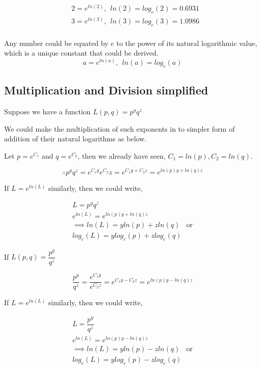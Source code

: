\documentclass[float=false,crop=false]{standalone}
\begin{document}
\[
\begin{aligned}
& 2 = e^{ln(2)}, \ \ ln(2) = log_e(2) = 0.6931 \\
& 3 = e^{ln(3)}, \ \ ln(3) = log_e(3) = 1.0986 \\
\end{aligned}
\]
\begin{tcolorbox}[colback=green!5,colframe=green!40!black,title=Any number in terms of $e$]
Any number could be equated by $e$ to the power of its natural logarithmic value, which is a unique constant that could be derived. 
\begin{equation}
    a = e^{ln(a)}, \ \ ln(a) = log_e(a)  \label{eq:MA03}
\end{equation}
\end{tcolorbox}
    \subsection{Multiplication and Division
simplified}\label{multiplication-and-division-simplified}

Suppose we have a function \(L(p,q) = p^yq^z\)

We could make the multiplication of such exponents in to simpler form of
addition of their natural logarithms as below.

Let \(p = e^{C_1}\) and \(q = e^{C_2}\), then we already have seen,
\(C_1 = ln(p), C_2 = ln(q)\).

\[
\therefore p^yq^z = e^{C_1y}e^{C_2}z = e^{C_1y + C_2z} = e^{ln(p)y + ln(q)z}
\]

If \(L = e^{ln(L)}\) similarly, then we could write,

\[
\begin{aligned}
L = p^yq^z \\
e^{ln(L)} = e^{ln(p)y + ln(q)z} \\
\implies ln(L) = yln(p) + zln(q) \ \ \ \ \text{or} \\
log_e(L) = ylog_e(p) + zlog_e(q)
\end{aligned}
\]

If \(L(p,q) = \dfrac{p^y}{q^z}\)

\[
\dfrac{p^y}{q^z} = \dfrac{e^{C_1y}}{e^{C_2z}} = e^{C_1y - C_2z} = e^{ln(p)y - ln(q)z}
\]

If \(L = e^{ln(L)}\) similarly, then we could write,

\[
\begin{aligned}
L = \dfrac{p^y}{q^z} \\
e^{ln(L)} = e^{ln(p)y - ln(q)z} \\
\implies ln(L) = yln(p) - zln(q) \ \ \ \ \text{or} \\
log_e(L) = ylog_e(p) - zlog_e(q)
\end{aligned}
\]
\end{document}
